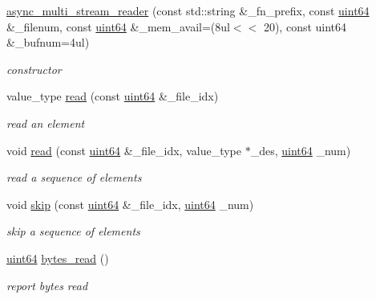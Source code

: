 \begin{DoxyCompactItemize}
\item 
\hyperlink{classasync__multi__stream__reader_af83e5faafb7612b51abc05e8edde52dd}{async\+\_\+multi\+\_\+stream\+\_\+reader} (const std\+::string \&\+\_\+fn\+\_\+prefix, const \hyperlink{types_8h_a60e8696a4678cd348e991a1f172e53f7}{uint64} \&\+\_\+filenum, const \hyperlink{types_8h_a60e8696a4678cd348e991a1f172e53f7}{uint64} \&\+\_\+mem\+\_\+avail=(8ul$<$$<$ 20), const uint64 \&\+\_\+bufnum=4ul)
\begin{DoxyCompactList}\small\item\em constructor \end{DoxyCompactList}\item 
value\+\_\+type \hyperlink{classasync__multi__stream__reader_ae47f5af3e9c0964be88975391631b3d4}{read} (const \hyperlink{types_8h_a60e8696a4678cd348e991a1f172e53f7}{uint64} \&\+\_\+file\+\_\+idx)
\begin{DoxyCompactList}\small\item\em read an element \end{DoxyCompactList}\item 
void \hyperlink{classasync__multi__stream__reader_a1b4db036726c5b33edf9cdca1ccc24d9}{read} (const \hyperlink{types_8h_a60e8696a4678cd348e991a1f172e53f7}{uint64} \&\+\_\+file\+\_\+idx, value\+\_\+type $\ast$\+\_\+des, \hyperlink{types_8h_a60e8696a4678cd348e991a1f172e53f7}{uint64} \+\_\+num)
\begin{DoxyCompactList}\small\item\em read a sequence of elements \end{DoxyCompactList}\item 
void \hyperlink{classasync__multi__stream__reader_a620b5917c284dbdb6b1f93ea425b9c0e}{skip} (const \hyperlink{types_8h_a60e8696a4678cd348e991a1f172e53f7}{uint64} \&\+\_\+file\+\_\+idx, \hyperlink{types_8h_a60e8696a4678cd348e991a1f172e53f7}{uint64} \+\_\+num)
\begin{DoxyCompactList}\small\item\em skip a sequence of elements \end{DoxyCompactList}\item 
\hyperlink{types_8h_a60e8696a4678cd348e991a1f172e53f7}{uint64} \hyperlink{classasync__multi__stream__reader_ab4ebef1c67d84d3581bc4ddaa0a1cc9b}{bytes\+\_\+read} ()
\begin{DoxyCompactList}\small\item\em report bytes read \end{DoxyCompactList}\item 
$$
\end{DoxyCompactItemize}
